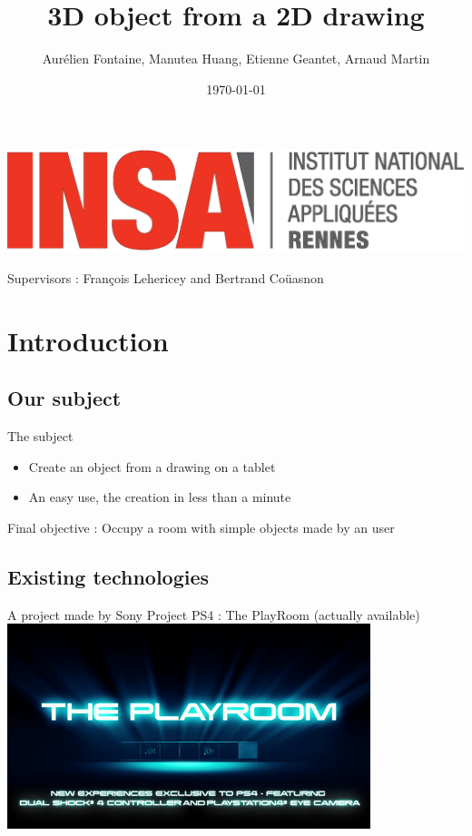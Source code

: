 \documentclass[a4paper,10pt]{beamer}
\title{3D object from a 2D drawing}
\author[Groupe 3INFO]{Aurélien Fontaine, Manutea Huang, Etienne Geantet, Arnaud Martin}
\institute[INSA de Rennes]{Institut National des Sciences Appliquées de Rennes}
\date{\today}
\begin{document}
	\begin{frame}
		\begin{titlepage}
			\centerline{\includegraphics[scale=0.1]{images/logoINSA.jpg}}
			Supervisors : François Lehericey and Bertrand Coüasnon	
		\end{titlepage}
	\end{frame}
	
	\begin{frame}
		\tableofcontents
	\end{frame}
	
	\section{Introduction}
	
		\subsection{Our subject}
	
			\begin{frame}{The subject}
				\begin{itemize}
					\item Create an object from a drawing on a tablet
					\item An easy use, the creation in less than a minute
				\end{itemize}
				Final objective : Occupy a room with simple objects made by an user
			\end{frame}
			
		\subsection{Existing technologies}
			
			\begin{frame}{A project made by Sony}
				Project PS4 : The PlayRoom (actually available)
				\href{run:The_PlayRoom.avi}{\includegraphics[width=300pt]{images/The-Playroom.jpg}}
			\end{frame}
			
\end{document}
